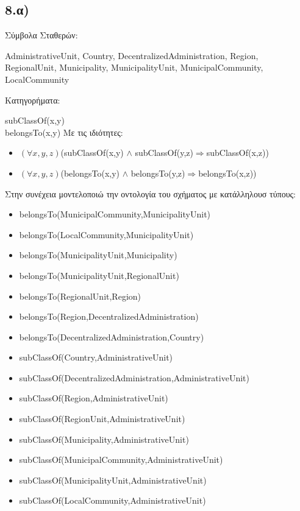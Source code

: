 \documentclass[12pt,a4paper]{article}
\begin{document}
\subsection*{8.α)}
\begin{large}
Σύμβολα Σταθερών: \\
\end{large}
\textlatin{AdministrativeUnit, Country, DecentralizedAdministration, Region, \\RegionalUnit, Municipality, MunicipalityUnit, MunicipalCommunity,\\ LocalCommunity}\vspace{3mm}\\
\begin{large}
Κατηγορήματα:\\
\end{large}
\textlatin{subClassOf(x,y)\\
belongsTo(x,y)}
Με τις ιδιότητες:\\
\begin{itemize}
\item\textlatin{$(\forall x,y,z)$(subClassOf(x,y) $\wedge$ subClassOf(y,z)$\Rightarrow$subClassOf(x,z))}
\item\textlatin{$(\forall x,y,z)$(belongsTo(x,y) $\wedge$ belongsTo(y,z)$\Rightarrow$belongsTo(x,z))}
\end{itemize}
Στην συνέχεια μοντελοποιώ την οντολογία του σχήματος με κατάλληλουσ τύπους:
\begin{itemize}
\item\textlatin{belongsTo(MunicipalCommunity,MunicipalityUnit)}
\item\textlatin{belongsTo(LocalCommunity,MunicipalityUnit)}
\item\textlatin{belongsTo(MunicipalityUnit,Municipality)}
\item\textlatin{belongsTo(MunicipalityUnit,RegionalUnit)}
\item\textlatin{belongsTo(RegionalUnit,Region)}
\item\textlatin{belongsTo(Region,DecentralizedAdministration)}
\item\textlatin{belongsTo(DecentralizedAdministration,Country)}
\item\textlatin{subClassOf(Country,AdministrativeUnit)}
\item\textlatin{subClassOf(DecentralizedAdministration,AdministrativeUnit)}
\item\textlatin{subClassOf(Region,AdministrativeUnit)}
\item\textlatin{subClassOf(RegionUnit,AdministrativeUnit)}
\item\textlatin{subClassOf(Municipality,AdministrativeUnit)}
\item\textlatin{subClassOf(MunicipalCommunity,AdministrativeUnit)}
\item\textlatin{subClassOf(MunicipalityUnit,AdministrativeUnit)}
\item\textlatin{subClassOf(LocalCommunity,AdministrativeUnit)}
\end{itemize}
\end{document}
